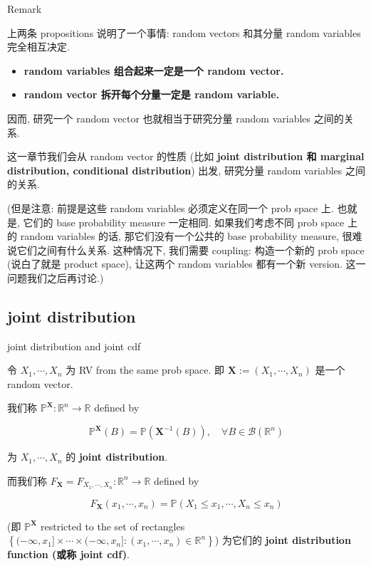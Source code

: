 \documentclass{qlnotes-export}
\begin{document}
\begin{qlremark}{Remark}

上两条 propositions 说明了一个事情: random vectors 和其分量 random variables 完全相互决定.

\begin{itemize}
\item
  \textbf{random variables 组合起来一定是一个 random vector.}
\item
  \textbf{random vector 拆开每个分量一定是 random variable.}
\end{itemize}

因而, 研究一个 random vector 也就相当于研究分量 random variables 之间的关系.

这一章节我们会从 random vector 的性质 (比如 \textbf{joint distribution 和 marginal distribution, conditional distribution}) 出发, 研究分量 random variables 之间的关系.

(但是注意: 前提是这些 random variables 必须定义在同一个 prob space 上. 也就是, 它们的 base probability measure 一定相同. 如果我们考虑不同 prob space 上的 random variables 的话, 那它们没有一个公共的 base probability measure, 很难说它们之间有什么关系. 这种情况下, 我们需要 coupling: 构造一个新的 prob space (说白了就是 product space), 让这两个 random variables 都有一个新 version. 这一问题我们之后再讨论.)

\end{qlremark}

\subsection{joint distribution}\label{joint-distribution}

\begin{definition}{joint distribution and joint cdf}\label{def-03-joint-conditional-distribution-joint-distribution-and-joint-cdf}

令 \(X_{1},\cdots,X_{n}\) 为 RV from the same prob space. 即 \(\mathbf{X} := (X_{1},\cdots,X_{n})\) 是一个 random vector.

我们称 \({\mathbb{P}}^{\mathbf{X}}:{\mathbb{R}}^{n}\rightarrow{\mathbb{R}}\) defined by

\[{\mathbb{P}}^{\mathbf{X}}(B) = {\mathbb{P}}(\mathbf{X}^{- 1}(B)),\quad\forall B \in \mathcal{B}({\mathbb{R}}^{n})\]

为 \(X_{1},\cdots,X_{n}\) 的 \textbf{joint distribution}.

而我们称 \(F_{\mathbf{X}} = F_{X_{1},\cdots,X_{n}}:{\mathbb{R}}^{n}\rightarrow{\mathbb{R}}\) defined by

\[F_{\mathbf{X}}(x_{1},\cdots,x_{n}) = {\mathbb{P}}(X_{1} \leq x_{1},\cdots,X_{n} \leq x_{n})\]

(即 \({\mathbb{P}}^{\mathbf{X}}\) restricted to the set of rectangles \(\left\{ {( - \infty,x_{1}\rbrack \times \cdots \times ( - \infty,x_{n}\rbrack:(x_{1},\cdots,x_{n}) \in {\mathbb{R}}^{n}} \right\}\)) 为它们的 \textbf{joint distribution function (或称 joint cdf)}.

\end{definition}
\end{document}
